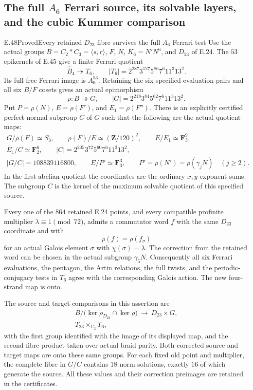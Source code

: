 \subsection{The full \texorpdfstring{$A_6$}{A6} Ferrari source, its solvable layers, and the cubic Kummer comparison}

\begin{statement}{E.48}{Proved}{Every retained $D_{23}$ fibre survives the full $A_6$ Ferrari test}
Use the actual groups $B=C_2*C_3=\langle s,r\rangle$, $F$, $N$,
$K_6=N'N^6$, and $D_{23}$ of E.24.
The $53$ epikernels of E.45 give a finite Ferrari quotient
\[
 \widehat B_4\twoheadrightarrow T_6,
 \qquad |T_6|=2^{287}3^{127}5^{86}7^6 11^3 13^2.
 \tag{E.48.1}
\]
Its full free Ferrari image is $A_6^{53}$.
Retaining the six specified evaluation pairs and all six $B/F$
cosets gives an actual epimorphism
\[
 \rho:B\twoheadrightarrow G,
 \qquad |G|=2^{218}3^{84}5^{62}7^6 11^3 13^2.
 \tag{E.48.2}
\]
Put $P=\rho(N)$, $E=\rho(F')$, and $E_1=\rho(F'')$.
There is an explicitly certified perfect normal subgroup $C$ of $G$
such that the following are the actual quotient maps:
\[
 \begin{gathered}
 G/\rho(F)\simeq S_3,\qquad
 \rho(F)/E\simeq(\mathbf Z/120)^2,\qquad
 E/E_1\simeq\mathbf F_3^9,\\
 E_1/C\simeq\mathbf F_2^6,\qquad
 |C|=2^{205}3^{72}5^{60}7^6 11^3 13^2,\\
 |G/C|=108839116800,
 \qquad E/P'\simeq\mathbf F_3^3,\qquad
 P'=\rho(N')=\rho(\gamma_jN)\quad(j\ge2).
 \end{gathered}
 \tag{E.48.3}
\]
In the first abelian quotient the coordinates are the ordinary
$x,y$ exponent sums.  The subgroup $C$ is the kernel of the
maximum solvable quotient of this specified source.

Every one of the $864$ retained E.24 points, and every compatible
profinite multiplier $\lambda\equiv1\pmod{72}$, admits a commutator
word $f$ with the same $D_{23}$ coordinate and with
\[
             \rho(f)=\rho(f_\sigma)
 \tag{E.48.4}
\]
for an actual Galois element $\sigma$ with
$\chi(\sigma)=\lambda$.
The correction from the retained word can be chosen in the actual
subgroup $\gamma_5N$.
Consequently all six Ferrari evaluations, the pentagon, the Artin
relations, the full twists, and the periodic-conjugacy tests in
$T_6$ agree with the corresponding Galois action.
The new four-strand map is onto.

The source and target comparisons in this assertion are
\[
 \begin{gathered}
 B/\bigl(\ker\rho_{D_{23}}\cap\ker\rho\bigr)
       \ \longrightarrow\ D_{23}\times G,\\
 T_{23}\times_{C_2}T_6,
 \end{gathered}
 \tag{E.48.5}
\]
with the first group identified with the image of its displayed
map, and the second fibre product taken over actual braid parity.
Both corrected source and target maps are onto these same groups.
For each fixed old point and multiplier, the complete fibre in
$G/C$ contains $18$ norm solutions, exactly $16$ of which generate
the source.  All these values and their correction preimages are
retained in the certificates.
\end{statement}

